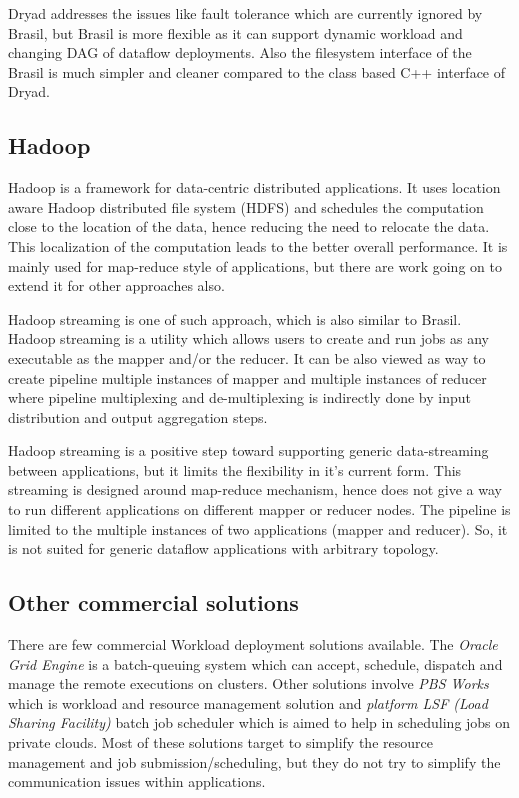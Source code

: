 \documentclass[conference]{sig-alternate}
\begin{document}
Dryad addresses the issues like fault tolerance which are currently ignored by
Brasil, but Brasil is more flexible as it can support dynamic workload and
changing DAG of dataflow deployments. Also the filesystem interface of the Brasil
is much simpler and cleaner compared to the class based C++ interface of Dryad.

\subsection{Hadoop}
Hadoop is a framework for data-centric distributed applications.   It
uses location aware Hadoop distributed file system (HDFS) and schedules the
computation close to the location of the data, hence reducing the need to
relocate the data.  This localization of the computation leads to the better
overall performance.  It is mainly used for map-reduce style of applications,
but there are work going on to extend it for other approaches also.

Hadoop streaming is one of such approach, which is also similar to Brasil.
Hadoop streaming is a utility which allows users to create and run jobs as any
executable as the mapper and/or the reducer.  It can be also viewed as way to
create pipeline multiple instances of mapper and multiple instances of reducer
where pipeline multiplexing and de-multiplexing is indirectly done by input
distribution and output aggregation steps.

Hadoop streaming is a positive step toward supporting generic data-streaming
between applications, but it limits the flexibility in it's current form. 
This streaming is designed around map-reduce mechanism, hence does not give a
way to run different applications on different mapper or reducer nodes.  The
pipeline is limited to the multiple instances of two applications
(mapper and reducer).  So, it is not suited for generic dataflow applications
with arbitrary topology.

\subsection{Other commercial solutions}
There are few commercial Workload deployment solutions available.  The
\textit{Oracle Grid Engine}\cite{oge} is a batch-queuing system which can
accept, schedule, dispatch and manage the remote executions on clusters. 
Other solutions involve \textit{PBS Works}\cite{pbsworks} which is workload
and resource management solution and \textit{platform LSF (Load Sharing
Facility)}\cite{platformLSF} batch job scheduler which is aimed to help in
scheduling jobs on private clouds.  Most of these solutions target to simplify
the resource management and job submission/scheduling, but they do not try to
simplify the communication issues within applications.
\end{document}
